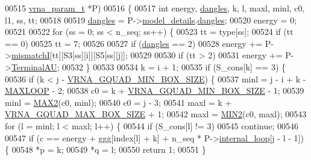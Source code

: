 \begin{DoxyCode}
00515                                     \mbox{\hyperlink{group__energy__parameters_structvrna__param__s}{vrna\_param\_t}}  *P)
00516 \{
00517   \textcolor{keywordtype}{int} energy, \mbox{\hyperlink{group__model__details_ga72b511ed1201f7e23ec437e468790d74}{dangles}}, k, l, maxl, minl, c0, l1, ss, tt;
00518 
00519   \mbox{\hyperlink{group__model__details_ga72b511ed1201f7e23ec437e468790d74}{dangles}} = P->\mbox{\hyperlink{group__energy__parameters_a7b84353eb9075c595bad4ceb871bcae7}{model\_details}}.\mbox{\hyperlink{group__model__details_adcda4ff2ea77748ae0e8700288282efc}{dangles}};
00520   energy  = 0;
00521 
00522   \textcolor{keywordflow}{for} (ss = 0; ss < n\_seq; ss++) \{
00523     tt = type[ss];
00524     \textcolor{keywordflow}{if} (tt == 0)
00525       tt = 7;
00526 
00527     \textcolor{keywordflow}{if} (\mbox{\hyperlink{group__model__details_ga72b511ed1201f7e23ec437e468790d74}{dangles}} == 2)
00528       energy += P->\mbox{\hyperlink{group__energy__parameters_af1a456ce5983b107c47e5dd25727205e}{mismatchI}}[tt][S3[ss][i]][S5[ss][j]];
00529 
00530     \textcolor{keywordflow}{if} (tt > 2)
00531       energy += P->\mbox{\hyperlink{group__energy__parameters_a0ad35507a03ba7f751e82cb375e991dd}{TerminalAU}};
00532   \}
00533 
00534   k = i + 1;
00535   \textcolor{keywordflow}{if} (S\_cons[k] == 3) \{
00536     \textcolor{keywordflow}{if} (k < j - \mbox{\hyperlink{group__energy__parameters_gad7bdd880afca461f97763d79ee57a347}{VRNA\_GQUAD\_MIN\_BOX\_SIZE}}) \{
00537       minl  = j - i + k - \mbox{\hyperlink{energy__const_8h_ad1bd6eabac419670ddd3c9ed82145988}{MAXLOOP}} - 2;
00538       c0    = k + \mbox{\hyperlink{group__energy__parameters_gad7bdd880afca461f97763d79ee57a347}{VRNA\_GQUAD\_MIN\_BOX\_SIZE}} - 1;
00539       minl  = \mbox{\hyperlink{group__utils_ga33297b3679c713b0c4d897cd0fe3b122}{MAX2}}(c0, minl);
00540       c0    = j - 3;
00541       maxl  = k + \mbox{\hyperlink{group__energy__parameters_ga56cafabad2f8a7db83f2d5d3b0e8d313}{VRNA\_GQUAD\_MAX\_BOX\_SIZE}} + 1;
00542       maxl  = \mbox{\hyperlink{group__utils_gae0b9cd0ce090bd69b951aa73e8fa4f7d}{MIN2}}(c0, maxl);
00543       \textcolor{keywordflow}{for} (l = minl; l < maxl; l++) \{
00544         \textcolor{keywordflow}{if} (S\_cons[l] != 3)
00545           \textcolor{keywordflow}{continue};
00546 
00547         \textcolor{keywordflow}{if} (c == energy + ggg[index[l] + k] + n\_seq * P->\mbox{\hyperlink{group__energy__parameters_a2a4fb2c65023ec371c9b96573da6d2fc}{internal\_loop}}[j - l - 1]) \{
00548           *p  = k;
00549           *q  = l;
00550           \textcolor{keywordflow}{return} 1;
00551         \}

\end{DoxyCode}

